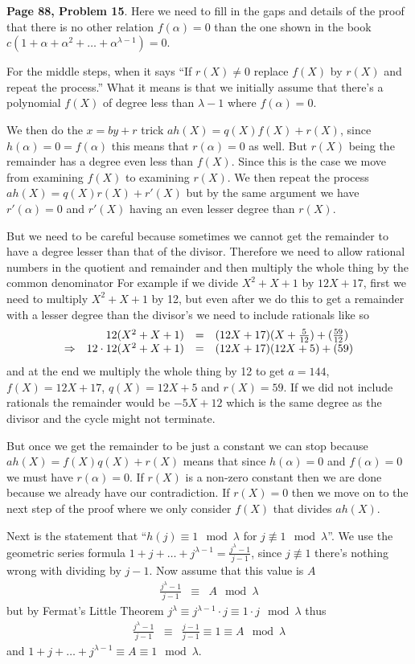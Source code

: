 \documentclass[aps,preprint,preprintnumbers,nofootinbib,showpacs,prd]{revtex4-1}
\newcommand{\nbea}{\begin{eqnarray*}}
\newcommand{\neea}{\end{eqnarray*}}
\begin{document}
{\bf Page 88, Problem 15}. Here we need to fill in the gaps and details of the proof that there is no other relation $f(\alpha) = 0$ than the one shown in the book $c(1 + \alpha + \alpha^2 + \dots + \alpha^{\lambda-1}) = 0$.

For the middle steps, when it says ``If $r(X) \neq 0$ replace $f(X)$ by $r(X)$ and repeat the process.'' What it means is that we initially assume that there's a polynomial $f(X)$ of degree less than $\lambda - 1$ where $f(\alpha) = 0$.

We then do the $x = by + r$ trick $ah(X) = q(X)f(X) + r(X)$, since $h(\alpha) = 0 = f(\alpha)$ this means that $r(\alpha) = 0$ as well. But $r(X)$ being the remainder has a degree even less than $f(X)$. Since this is the case we move from examining $f(X)$ to examining $r(X)$. We then repeat the process $ah(X) = q(X)r(X) + r'(X)$ but by the same argument we have $r'(\alpha) = 0$ and $r'(X)$ having an even lesser degree than $r(X)$. 

But we need to be careful because sometimes we cannot get the remainder to have a degree lesser than that of the divisor. Therefore we need to allow rational numbers in the quotient and remainder and then multiply the whole thing by the common denominator  For example if we divide $X^2 + X + 1$ by $12X + 17$, first we need to multiply $X^2 + X + 1$ by 12, but even after we do this to get a remainder with a lesser degree than the divisor's we need to include rationals like so
%
\nbea
\begin{array}{c r c l}
& 12(X^2 + X + 1) & = & (12X + 17)(X + \tfrac{5}{12}) + (\tfrac{59}{12}) \\
\Rightarrow & 12\cdot12(X^2 + X + 1) & = & (12X + 17)(12X + 5) + (59)
\end{array}
\neea
%
and at the end we multiply the whole thing by 12 to get $a = 144$, $f(X) = 12X + 17$, $q(X) = 12X + 5$ and $r(X) = 59$. If we did not include rationals the remainder would be $-5X + 12$ which is the same degree as the divisor and the cycle might not terminate.

But once we get the remainder to be just a constant we can stop because $ah(X) = f(X)q(X) + r(X)$ means that since $h(\alpha) = 0$ and $f(\alpha) = 0$ we must have $r(\alpha) = 0$. If $r(X)$ is a non-zero constant then we are done because we already have our contradiction. If $r(X) = 0$ then we move on to the next step of the proof where we only consider $f(X)$ that divides $ah(X)$.

Next is the statement that ``$h(j) \equiv 1 \mod{\lambda}$ for $j \not\equiv 1 \mod{\lambda}$''. We use the geometric series formula $1 + j + \dots + j^{\lambda - 1} = \frac{j^\lambda - 1}{j - 1}$, since $j \not\equiv 1$ there's nothing wrong with dividing by $j - 1$. Now assume that this value is $A$
%
\nbea
\frac{j^\lambda - 1}{j - 1} & \equiv & A \mod{\lambda}
\neea
%
but by Fermat's Little Theorem $j^{\lambda} \equiv j^{\lambda - 1}\cdot j \equiv 1 \cdot j \mod{\lambda}$ thus 
%
\nbea
\frac{j^\lambda - 1}{j - 1} & \equiv & \frac{j - 1}{j - 1} \equiv 1 \equiv A \mod{\lambda}
\neea
%
and $1 + j + \dots + j^{\lambda - 1} \equiv A \equiv 1 \mod{\lambda}$.
\end{document}
